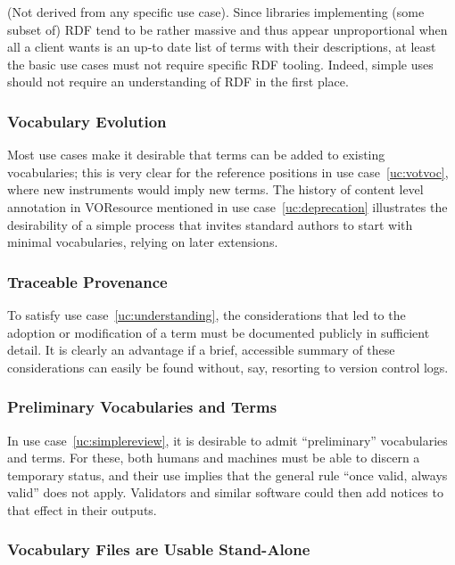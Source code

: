\documentclass[11pt,a4paper]{ivoa}
\begin{document}
(Not derived from any specific use case).  Since libraries implementing
(some subset of) RDF tend to be rather massive and thus appear
unproportional when all a client wants is an up-to date list of terms
with their descriptions, at least the basic use cases must not require
specific RDF tooling.  Indeed, simple uses should not require an
understanding of RDF in the first place.


\subsubsection{Vocabulary Evolution}
\label{req:evolution}

Most use cases make it desirable that terms can be added to existing
vocabularies; this is very clear for the reference positions in
use case~\ref{uc:votvoc}, where new instruments would imply new
terms.  The history of content level annotation in VOResource mentioned
in use case~\ref{uc:deprecation} illustrates the desirability of a
simple process that invites standard authors to start with minimal
vocabularies, relying on later extensions.

\subsubsection{Traceable Provenance}
\label{req:traceable}

To satisfy use case~\ref{uc:understanding}, the considerations that led
to the adoption or modification of a term must be documented publicly
in sufficient detail.  It is clearly an advantage if a brief, accessible
summary of these considerations can easily be found without, say,
resorting to version control logs.

\subsubsection{Preliminary Vocabularies and Terms}
\label{req:preliminary}

In use case~\ref{uc:simplereview}, it is desirable to admit
``preliminary'' vocabularies and terms.  For these, both humans
and machines must be able to discern a temporary status, and
their use implies that the general rule ``once valid, always
valid'' does not apply.  Validators and similar software could
then add notices to that effect in their outputs.

\subsubsection{Vocabulary Files are Usable Stand-Alone}
\label{req:standalone}
\end{document}
